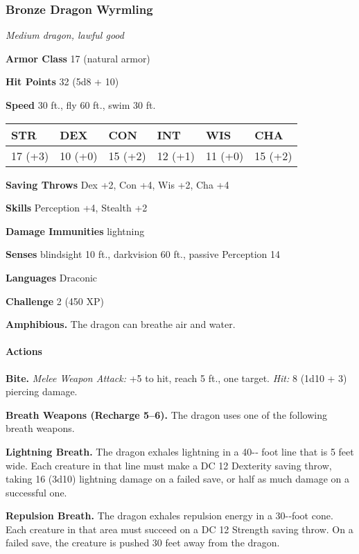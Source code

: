 \documentclass[
]{article}
\begin{document}
\hypertarget{bronze-dragon-wyrmling}{%
\subsubsection{Bronze Dragon Wyrmling}\label{bronze-dragon-wyrmling}}

\emph{Medium dragon, lawful good}

\textbf{Armor Class} 17 (natural armor)

\textbf{Hit Points} 32 (5d8 + 10)

\textbf{Speed} 30 ft., fly 60 ft., swim 30 ft.

\begin{longtable}[]{@{}llllll@{}}
\toprule
STR & DEX & CON & INT & WIS & CHA\tabularnewline
\midrule
\endhead
17 (+3) & 10 (+0) & 15 (+2) & 12 (+1) & 11 (+0) & 15 (+2)\tabularnewline
\bottomrule
\end{longtable}

\textbf{Saving Throws} Dex +2, Con +4, Wis +2, Cha +4

\textbf{Skills} Perception +4, Stealth +2

\textbf{Damage Immunities} lightning

\textbf{Senses} blindsight 10 ft., darkvision 60 ft., passive Perception
14

\textbf{Languages} Draconic

\textbf{Challenge} 2 (450 XP)

\textbf{Amphibious.} The dragon can breathe air and water.

\hypertarget{actions-50}{%
\paragraph{Actions}\label{actions-50}}

\textbf{Bite.} \emph{Melee Weapon Attack:} +5 to hit, reach 5 ft., one
target. \emph{Hit:} 8 (1d10 + 3) piercing damage.

\textbf{Breath Weapons (Recharge 5--6).} The dragon uses one of the
following breath weapons.

\textbf{Lightning Breath.} The dragon exhales lightning in a 40-­‐ foot
line that is 5 feet wide. Each creature in that line must make a DC 12
Dexterity saving throw, taking 16 (3d10) lightning damage on a failed
save, or half as much damage on a successful one.

\textbf{Repulsion Breath.} The dragon exhales repulsion energy in a
30-­‐foot cone. Each creature in that area must succeed on a DC 12
Strength saving throw. On a failed save, the creature is pushed 30 feet
away from the dragon.
\end{document}
